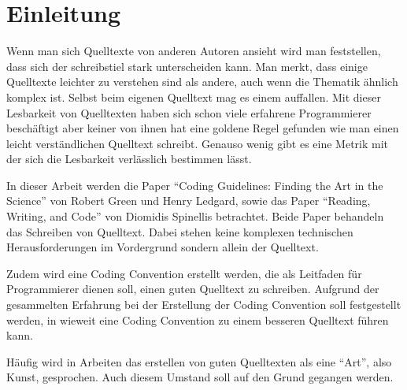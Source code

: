 \section{Einleitung}
Wenn man sich Quelltexte von anderen Autoren ansieht wird man feststellen, dass sich der schreibstiel stark unterscheiden kann. Man merkt, dass einige Quelltexte leichter zu verstehen sind als andere, auch wenn die Thematik ähnlich komplex ist. Selbst beim eigenen Quelltext mag es einem auffallen. Mit dieser Lesbarkeit von Quelltexten haben sich schon viele erfahrene Programmierer beschäftigt\cite{Knuth, Heusser, Kamp, Martin, reed} aber keiner von ihnen hat eine goldene Regel gefunden wie man einen leicht verständlichen Quelltext schreibt. Genauso wenig gibt es eine Metrik mit der sich die Lesbarkeit verlässlich bestimmen lässt.

In dieser Arbeit werden die Paper \enquote{Coding Guidelines: Finding the Art in the Science} von Robert Green und Henry Ledgard\cite{Green}, sowie das Paper \enquote{Reading, Writing, and Code} von Diomidis Spinellis\cite{Spinellis} betrachtet. Beide Paper behandeln das Schreiben von Quelltext. Dabei stehen keine komplexen technischen Herausforderungen im Vordergrund sondern allein der Quelltext.

Zudem wird eine Coding Convention erstellt werden, die als Leitfaden für Programmierer dienen soll, einen guten Quelltext zu schreiben. Aufgrund der gesammelten Erfahrung bei der Erstellung der Coding Convention soll festgestellt werden, in wieweit eine Coding Convention zu einem besseren Quelltext führen kann.

Häufig wird in Arbeiten das erstellen von guten Quelltexten als eine \enquote{Art}, also Kunst, gesprochen. Auch diesem Umstand soll auf den Grund gegangen werden.
